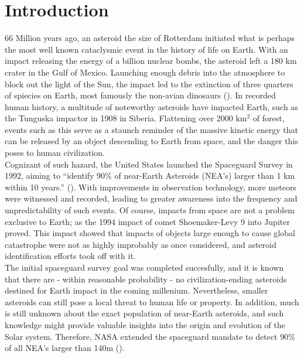 \chapter{Introduction}
\label{ch:introduction}
66 Million years ago, an asteroid the size of Rotterdam initiated what is perhaps the most well known cataclysmic event in the history of life on Earth. With an impact releasing the energy of a billion nuclear bombs, the asteroid left a 180 km crater in the Gulf of Mexico. Launching enough debris into the atmosphere to block out the light of the Sun, the impact led to the extinction of three quarters of spiecies on Earth, most famously the non-avian dinosaurs (\cite{DinosaurAsteroid}). In recorded human history, a multitude of noteworthy asteroids have impacted Earth, such as the Tunguska impactor in 1908 in Siberia. Flattening over 2000 km$^2$ of forest, events such as this serve as a staunch reminder of the massive kinetic energy that can be released by an object descending to Earth from space, and the danger this poses to human civilization.\\

Cognizant of such hazard, the United States launched the Spaceguard Survey in 1992, aiming to ``identify 90\% of near-Earth Asteroids (NEA's) larger than 1 km within 10 years.'' (\cite{Spaceguard}). With improvements in observation technology, more meteors were witnessed and recorded, leading to greater awareness into the frequency and unpredictability of such events. Of course, impacts from space are not a problem exclusive to Earth; as the 1994 impact of comet Shoemaker-Levy 9 into Jupiter proved. This impact showed that impacts of objects large enough to cause global catastrophe were not as highly improbably as once considered, and asteroid identification efforts took off with it.\\

The initial spaceguard survey goal was completed succesfully, and it is known that there are - within reasonable probability - no civilization-ending asteroids destined for Earth impact in the coming millenium. Nevertheless, smaller asteroids can still pose a local threat to human life or property. In addition, much is still unknown about the exact population of near-Earth asteroids, and such knowledge might provide valuable insights into the origin and evolution of the Solar system. Therefore, NASA extended the spaceguard mandate to detect 90\% of all NEA's larger than 140m (\cite{SpaceguardHistory}). \\

